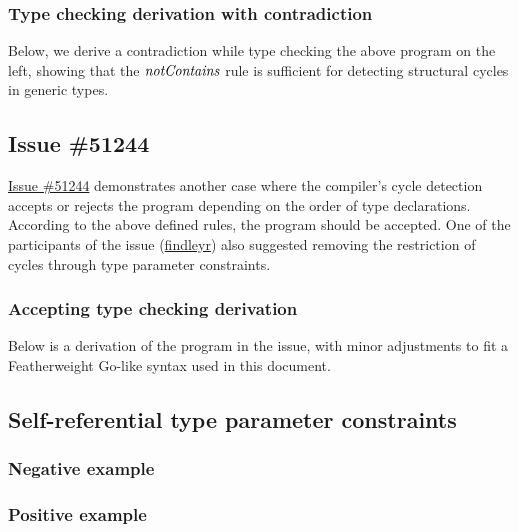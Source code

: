 \documentclass[12pt]{article}
\begin{document}
\subsubsection{Type checking derivation with contradiction}

Below, we derive a contradiction while type checking the above program on the
left, showing that the $\mathit{notContains}$ rule is sufficient for detecting structural
cycles in generic types.



\subsection{Issue \#51244}

\href{https://github.com/golang/go/issues/51244}{Issue \#51244} demonstrates
another case where the compiler's cycle detection accepts or rejects the program
depending on the order of type declarations. According to the above defined
rules, the program should be accepted. One of the participants of the issue
(\href{https://github.com/findleyr}{findleyr}) also suggested removing the
restriction of cycles through type parameter constraints.

\subsubsection{Accepting type checking derivation}


\noindent
Below is a derivation of the program in the issue, with minor adjustments to
fit a Featherweight Go-like syntax used in this document.




\subsection{Self-referential type parameter constraints}


\subsubsection{Negative example}




\subsubsection{Positive example}




\end{document}
